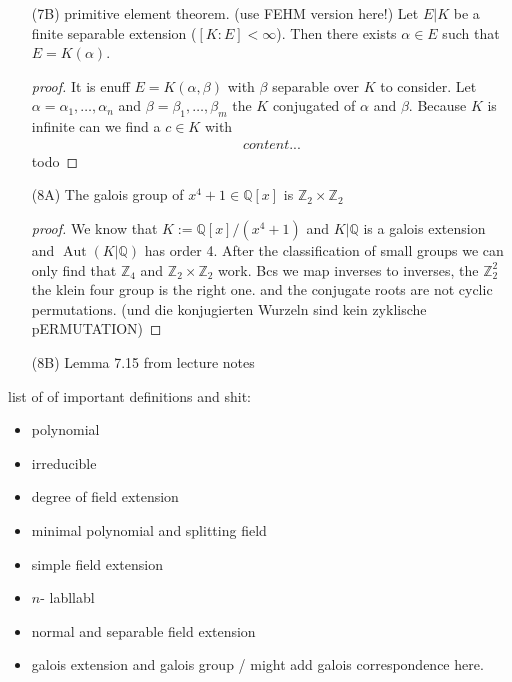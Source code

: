\documentclass[]{scrartcl}
\newcommand{\Z}{\mathbb{Z}}
\newcommand{\Q}{\mathbb{Q}}
\newcommand{\<}{\trianglelefteq}
\DeclareMathOperator{\Aut}{Aut}
\begin{document}
\begin{itemize}
\begin{proof}[proof]
		Now if $ \beta_1 \in E $ then $ E(\beta_1) = E $ and therefore $ [E(\beta_1): E] = 1 $. By our above considerations we deduce
		$ [E(\beta_2): E] = 1 $, which in turn means $ \beta_2 \in E $. That is, if $ g(x) $ has a zero in $ E $ then 
		every other zero of $ g(x) $ will be contained in $ E $ as well. This means that $ E|K $ is normal.
	\end{proof}
	\item[(7B)] primitive element theorem. (use FEHM version here!)
	Let $ E|K $ be a finite separable extension ($[K\colon E] < \infty$). Then there exists $ \alpha \in E $ such that $ E = K(\alpha) $.
	\begin{proof}[proof]
		It is enuff $E = K(\alpha, \beta)$ with $\beta$ separable over $K$ to consider. Let $\alpha = \alpha_1, \dots, \alpha_n$ and $\beta = \beta_1, \dots, \beta_m$ the $K$ conjugated of $\alpha$ and $\beta$. Because $K$ is infinite can we find a $c \in K$ with 
		\begin{align*}
		content...
		\end{align*}
		todo
	\end{proof}
	\item[(8A)] The galois group of $x^4 +1 \in \Q[x]$ is $\Z_2 \times \Z_2$ 
	\begin{proof}[proof]
		We know that $K := \Q[x]/(x^4 +1)$ and $K | \Q$ is a galois extension and $\Aut(K |\Q)$ has order 4. After the classification of small groups we can only find that $\Z_4$ and $\Z_2 \times \Z_2$ work. Bcs we map inverses to inverses, the $\Z_2^2$ the klein four group is the right one. and the conjugate roots are not cyclic permutations. (und die konjugierten Wurzeln sind kein zyklische pERMUTATION)
	\end{proof}
	\item[(8B)] Lemma 7.15 from lecture notes
\end{itemize}

list of of important definitions and shit:
\begin{itemize}
	\item polynomial
	\item irreducible
	\item degree of field extension
	\item minimal polynomial and splitting field
	\item simple field extension
	\item $n$- labllabl
	\item normal and separable field extension
	\item galois extension and galois group / might add galois correspondence here.
\end{itemize}
\end{document}
